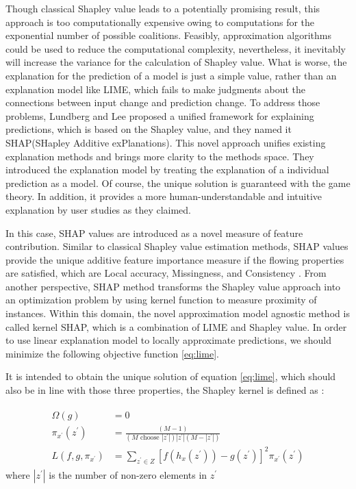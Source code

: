 Though classical Shapley value leads to a potentially promising result, this approach is too computationally expensive owing to computations for the exponential number of possible coalitions. Feasibly, approximation algorithms could be used to reduce the computational complexity, nevertheless, it inevitably will increase the variance for the calculation of Shapley value. What is worse, the explanation for the prediction of a model is just a simple value, rather than an explanation model like LIME, which fails to make judgments about the connections between input change and prediction change. To address those problems, Lundberg and Lee \cite{lundberg2017unified} proposed a unified framework for explaining predictions, which is based on the Shapley value, and they named it SHAP(SHapley Additive exPlanations). This novel approach unifies existing explanation methods and brings more clarity to the methods space. They introduced the explanation model by treating the explanation of a individual prediction as a model. Of course, the unique solution is guaranteed with the game theory. In addition, it provides a more human-understandable and intuitive explanation by user studies as they claimed. 

In this case, SHAP values are introduced as a novel measure of feature contribution. Similar to classical Shapley value estimation methods, SHAP values provide the unique additive feature importance measure if the flowing properties are satisfied, which are Local accuracy, Missingness, and Consistency \cite{lundberg2017unified}. From another perspective, SHAP method transforms the Shapley value approach into an optimization problem by using kernel function to measure proximity of instances. Within this domain, the novel approximation model agnostic method is called kernel SHAP, which is a combination of LIME and Shapley value. In order to use linear explanation model to locally approximate predictions, we should minimize the following objective function \ref{eq:lime}. 

It is intended to obtain the unique solution of equation \ref{eq:lime}, which should also be in line with those three properties, the Shapley kernel is defined as \cite{lundberg2017unified}:

\begin{equation} \label{eq:shap_kernel}
\begin{gathered}
\begin{aligned} \Omega(g) &=0 \\ \pi_{x^{\prime}}\left(z^{\prime}\right) &=\frac{(M-1)}{\left(M \text { choose }\left|z^{\prime}\right|\right)\left|z^{\prime}\right|\left(M-\left|z^{\prime}\right|\right)} \\ L\left(f, g, \pi_{x^{\prime}}\right) &=\sum_{z^{\prime} \in Z}\left[f\left(h_{x}\left(z^{\prime}\right)\right)-g\left(z^{\prime}\right)\right]^{2} \pi_{x^{\prime}}\left(z^{\prime}\right) \end{aligned}
\end{gathered}
\end{equation}
where $|z^\prime|$ is the number of non-zero elements in $z^\prime$

